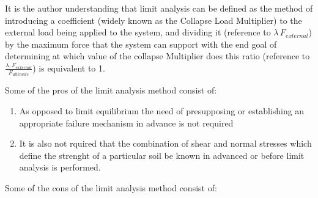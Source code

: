 \documentclass{article}
\begin{document}
\vspace{1em}
\label{H_30A975B5}

\begin{par}
\begin{flushleft}
It is the author understanding that limit analysis can be defined as the method of introducing a coefficient (widely known as the Collapse Load Multiplier) to the external load being applied to the system, and dividing it (reference to $\lambda\,F_{external}$) by the maximum force that the system can support with the end goal of determining at which value of the collapse Multiplier does this ratio (reference to $\frac{\lambda,F_{external}}{F_{ultimate}}$) is equivalent to 1.
\end{flushleft}
\end{par}

\label{H_69352789}
\begin{par}
\begin{flushleft}
 Some of the pros of the limit analysis method consist of:
\end{flushleft}
\end{par}

\begin{enumerate}
\setlength{\itemsep}{-1ex}
   \item{\begin{flushleft} As opposed to limit equilibrium the need of presupposing or establishing an appropriate failure mechanism in advance is not required \end{flushleft}}
   \item{\begin{flushleft} It is also not rquired that the combination of shear and normal stresses which define the strenght of a particular soil be known in advanced or before limit analysis is performed.  \end{flushleft}}
\end{enumerate}

\begin{par}
\begin{flushleft}
Some of the cons of the limit analysis method consist of:
\end{flushleft}
\end{par}
\end{document}
